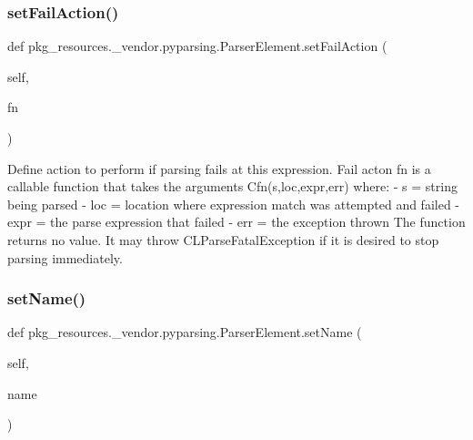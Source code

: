 \subsubsection{\texorpdfstring{set\+Fail\+Action()}{setFailAction()}}
{\footnotesize\ttfamily def pkg\+\_\+resources.\+\_\+vendor.\+pyparsing.\+Parser\+Element.\+set\+Fail\+Action (\begin{DoxyParamCaption}\item[{}]{self,  }\item[{}]{fn }\end{DoxyParamCaption})}

\begin{DoxyVerb}Define action to perform if parsing fails at this expression.
   Fail acton fn is a callable function that takes the arguments
   C{fn(s,loc,expr,err)} where:
    - s = string being parsed
    - loc = location where expression match was attempted and failed
    - expr = the parse expression that failed
    - err = the exception thrown
   The function returns no value.  It may throw C{L{ParseFatalException}}
   if it is desired to stop parsing immediately.\end{DoxyVerb}
 \mbox{\label{classpkg__resources_1_1__vendor_1_1pyparsing_1_1_parser_element_a65024e7147c8b3d4fd3d0d161429737f}} 
\subsubsection{\texorpdfstring{set\+Name()}{setName()}}
{\footnotesize\ttfamily def pkg\+\_\+resources.\+\_\+vendor.\+pyparsing.\+Parser\+Element.\+set\+Name (\begin{DoxyParamCaption}\item[{}]{self,  }\item[{}]{name }\end{DoxyParamCaption})}

